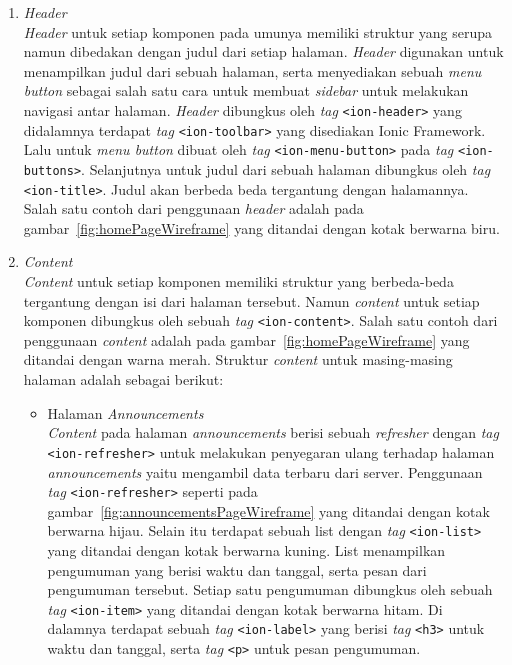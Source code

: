 	\begin{enumerate}
		\item \textit{Header} \\
			\textit{Header} untuk setiap komponen pada umunya memiliki struktur yang serupa namun dibedakan dengan judul dari setiap halaman. \textit{Header} digunakan untuk menampilkan judul dari sebuah halaman, serta menyediakan sebuah \textit{menu button} sebagai salah satu cara untuk membuat \textit{sidebar} untuk melakukan navigasi antar halaman. \textit{Header} dibungkus oleh \textit{tag} \texttt{<ion-header>} yang didalamnya terdapat \textit{tag} \texttt{<ion-toolbar>} yang disediakan Ionic Framework. Lalu untuk \textit{menu button} dibuat oleh \textit{tag} \texttt{<ion-menu-button>} pada \textit{tag} \texttt{<ion-buttons>}. Selanjutnya untuk judul dari sebuah halaman dibungkus oleh \textit{tag} \texttt{<ion-title>}. Judul akan berbeda beda tergantung dengan halamannya. Salah satu contoh dari penggunaan \textit{header} adalah pada gambar~\ref{fig:homePageWireframe} yang ditandai dengan kotak berwarna biru.
			
		\item \textit{Content} \\
			\textit{Content} untuk setiap komponen memiliki struktur yang berbeda-beda tergantung dengan isi dari halaman tersebut. Namun \textit{content} untuk setiap komponen dibungkus oleh sebuah \textit{tag} \texttt{<ion-content>}. Salah satu contoh dari penggunaan \textit{content} adalah pada gambar~\ref{fig:homePageWireframe} yang ditandai dengan warna merah. Struktur \textit{content} untuk masing-masing halaman adalah sebagai berikut:
			
			\begin{itemize}
				\item Halaman \textit{Announcements} \\
					\textit{Content} pada halaman \textit{announcements} berisi sebuah \textit{refresher} dengan \textit{tag} \texttt{<ion-refresher>} untuk melakukan penyegaran ulang terhadap halaman \textit{announcements} yaitu mengambil data terbaru dari server. Penggunaan \textit{tag} \texttt{<ion-refresher>} seperti pada gambar~\ref{fig:announcementsPageWireframe} yang ditandai dengan kotak berwarna hijau. Selain itu terdapat sebuah list dengan \textit{tag} \texttt{<ion-list>} yang ditandai dengan kotak berwarna kuning. List menampilkan pengumuman yang berisi waktu dan tanggal, serta pesan dari pengumuman tersebut. Setiap satu pengumuman dibungkus oleh sebuah \textit{tag} \texttt{<ion-item>} yang ditandai dengan kotak berwarna hitam. Di dalamnya terdapat sebuah \textit{tag} \texttt{<ion-label>} yang berisi \textit{tag} \texttt{<h3>} untuk waktu dan tanggal, serta \textit{tag} \texttt{<p>} untuk pesan pengumuman.		
				

\end{itemize}
\end{enumerate}
